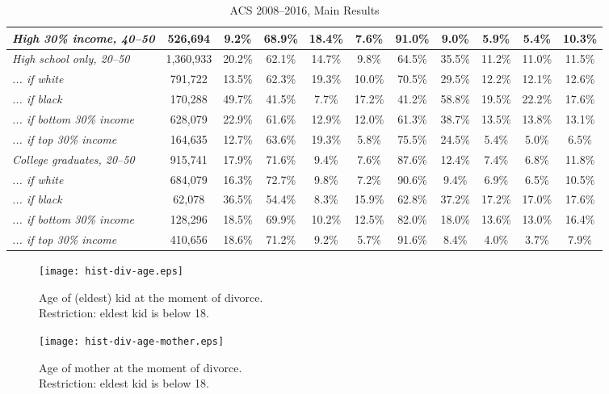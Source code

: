 \documentclass[12pt,letter]{article}
\begin{document}
\begin{landscape}
\begin{table}
\begin{center}
\begin{tabular}{|l|c|c|c|c|c||c|c|c|c|c|}
\emph{High 30\% income, 40--50} &  \footnotesize 526,694 &  9.2\% & 68.9\% & 18.4\% &   7.6\% & 91.0\% &  9.0\% &  5.9\% &  5.4\% & 10.3\% \\\hline\hline
\emph{High school only, 20--50} &  \footnotesize 1,360,933 & 20.2\% & 62.1\% & 14.7\% &   9.8\% & 64.5\% & 35.5\% & 11.2\% & 11.0\% & 11.5\% \\
\emph{... if white} &  \footnotesize 791,722 & 13.5\% & 62.3\% & 19.3\% &  10.0\% & 70.5\% & 29.5\% & 12.2\% & 12.1\% & 12.6\% \\
\emph{... if black} &  \footnotesize 170,288 & 49.7\% & 41.5\% &  7.7\% &  17.2\% & 41.2\% & 58.8\% & 19.5\% & 22.2\% & 17.6\% \\
\emph{... if bottom 30\% income} &  \footnotesize 628,079 & 22.9\% & 61.6\% & 12.9\% &  12.0\% & 61.3\% & 38.7\% & 13.5\% & 13.8\% & 13.1\% \\
\emph{... if top 30\% income} &  \footnotesize 164,635 & 12.7\% & 63.6\% & 19.3\% &   5.8\% & 75.5\% & 24.5\% &  5.4\% &  5.0\% &  6.5\% \\
\hline
\emph{College graduates, 20--50} &  \footnotesize 915,741 & 17.9\% & 71.6\% &  9.4\% &   7.6\% & 87.6\% & 12.4\% &  7.4\% &  6.8\% & 11.8\% \\
\emph{... if white} &  \footnotesize 684,079 & 16.3\% & 72.7\% &  9.8\% &   7.2\% & 90.6\% &  9.4\% &  6.9\% &  6.5\% & 10.5\% \\
\emph{... if black} &  \footnotesize 62,078 & 36.5\% & 54.4\% &  8.3\% &  15.9\% & 62.8\% & 37.2\% & 17.2\% & 17.0\% & 17.6\% \\
\emph{... if bottom 30\% income} &  \footnotesize 128,296 & 18.5\% & 69.9\% & 10.2\% &  12.5\% & 82.0\% & 18.0\% & 13.6\% & 13.0\% & 16.4\% \\
\emph{... if top 30\% income} &  \footnotesize 410,656 & 18.6\% & 71.2\% &  9.2\% &   5.7\% & 91.6\% &  8.4\% &  4.0\% &  3.7\% &  7.9\% \\
\hline
\end{tabular}
\end{center}
\caption{ACS 2008--2016, Main Results\label{main-results}}
\end{table}
\end{landscape}

\newpage


\begin{figure}
\begin{center}
\texttt{[image: hist-div-age.eps]}
\caption{Age of (eldest) kid at the moment of divorce. \\ Restriction: eldest kid is below 18.\label{age-kid}}
\end{center}
\end{figure}
\begin{figure}
\begin{center}
\texttt{[image: hist-div-age-mother.eps]}
\caption{Age of mother at the moment of divorce.  \\ Restriction: eldest kid is below 18.\label{age-mother}}
\end{center}
\end{figure}
\end{document}
